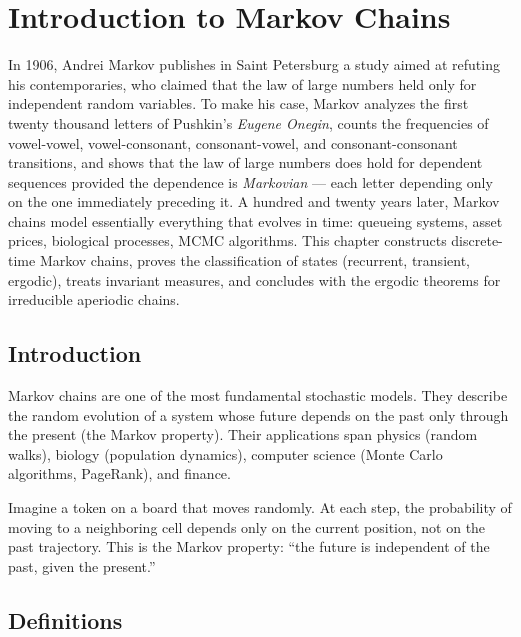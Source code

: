 \chapter{Introduction to Markov Chains}
\label{ch:markov}

In 1906, Andrei Markov publishes in Saint Petersburg a study aimed at refuting his contemporaries, who claimed that the law of large numbers held only for independent random variables. To make his case, Markov analyzes the first twenty thousand letters of Pushkin's \emph{Eugene Onegin}, counts the frequencies of vowel-vowel, vowel-consonant, consonant-vowel, and consonant-consonant transitions, and shows that the law of large numbers does hold for dependent sequences provided the dependence is \emph{Markovian} --- each letter depending only on the one immediately preceding it. A hundred and twenty years later, Markov chains model essentially everything that evolves in time: queueing systems, asset prices, biological processes, MCMC algorithms. This chapter constructs discrete-time Markov chains, proves the classification of states (recurrent, transient, ergodic), treats invariant measures, and concludes with the ergodic theorems for irreducible aperiodic chains.

\section{Introduction}

Markov chains are one of the most fundamental stochastic models.
They describe the random evolution of a system whose future depends on the past only
through the present (the Markov property). Their applications span physics (random
walks), biology (population dynamics), computer science (Monte Carlo algorithms,
PageRank), and finance.

\begin{intuition}[title=\textbf{The Markov property: memorylessness}]
Imagine a token on a board that moves randomly. At each step, the probability of
moving to a neighboring cell depends only on the current position, not on the past
trajectory. This is the Markov property: ``the future is independent of the past,
given the present.''
\end{intuition}

\section{Definitions}

